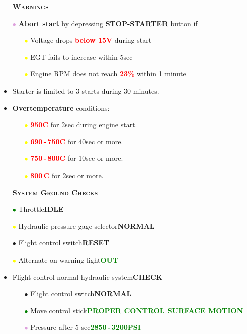 \documentclass[a4paper,12pt,dvipsnames]{letter}
\newcommand{\button}[1]{\textbf{#1}}
\newcommand{\degC}{\textdegree{}C}
\newcommand{\ok}[1]{\textcolor{Green}{\textbf{#1}}}
\newcommand{\warn}[1]{\textcolor{Red}{\textbf{#1}}}
\newcommand{\myHead}[1]{{\LARGE\textsc{\textbf{#1}}}}
\newcommand{\myhead}[1]{{\Large\textsc{\textbf{#1}}}}
\newcommand{\gi}{\textcolor{Green}{$\bullet$\;}}
\newcommand{\yi}{\textcolor{Yellow}{$\bullet$\;}}
\newcommand{\vi}{\textcolor{Plum}{$\bullet$\;}}
\newcommand{\ai}{\textcolor{Apricot}{$\bullet$\;}}
\begin{document}
{\begin{itemize}
\end{itemize}
\begin{itemize}
\item[] \myhead{Warnings}
\item[\vi] \textbf{Abort start} by depressing \button{STOP-STARTER} button if
\begin{itemize}
  \item[\yi] Voltage drops \warn{below 15\;V} during start
  \item[\yi] EGT fails to increase within 5\;sec
  \item[\yi] Engine RPM does not reach \warn{23\%} within 1 minute
\end{itemize}
\item Starter is limited to 3 starts during 30 minutes.
\item \textbf{Overtemperature} conditions:
\begin{itemize}
\item[\yi] \warn{950\degC} for 2\;sec during engine start.
\item[\yi] \warn{690\,-\,750\degC} for 40\;sec or more.
\item[\yi] \warn{750\,-\,800\degC} for 10\;sec or more.
\item[\yi] \warn{800\,\degC} for 2\;sec or more.
\end{itemize}
\end{itemize}
\newpage
\begin{itemize}
\item[] \myHead{System Ground Checks}
\item[\gi] Throttle\dotfill\button{IDLE}
\item[\yi] Hydraulic pressure gage selector\dotfill\button{NORMAL}
\item[\ai] Flight control switch\dotfill\button{RESET}
\item[\yi] Alternate-on warning light\dotfill\ok{OUT}
\item Flight control normal hydraulic system\dotfill\button{CHECK}
\begin{itemize}
 \item[\ai] Flight control switch\dotfill\button{NORMAL}
 \item[\gi] Move control stick\dotfill\ok{PROPER CONTROL SURFACE MOTION}
 \item[\vi] Pressure after 5 sec\dotfill\ok{2850\,-\,3200\;PSI}

\end{itemize}
\end{itemize}}
\end{document}
